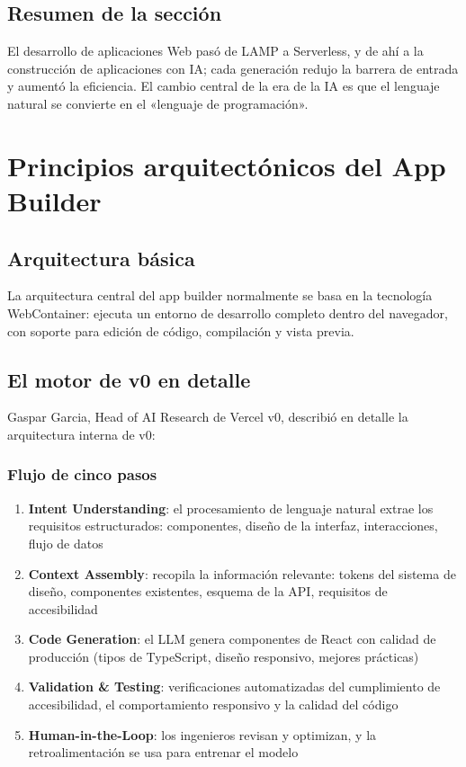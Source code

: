 \documentclass[a4paper]{article}
\begin{document}
\subsection{Resumen de la sección}

El desarrollo de aplicaciones Web pasó de LAMP a Serverless, y de ahí a la construcción de aplicaciones con IA; cada generación redujo la barrera de entrada y aumentó la eficiencia. El cambio central de la era de la IA es que el lenguaje natural se convierte en el «lenguaje de programación».

\section{Principios arquitectónicos del App Builder}

\subsection{Arquitectura básica}

La arquitectura central del app builder normalmente se basa en la tecnología WebContainer: ejecuta un entorno de desarrollo completo dentro del navegador, con soporte para edición de código, compilación y vista previa.

\subsection{El motor de v0 en detalle}

Gaspar Garcia, Head of AI Research de Vercel v0, describió en detalle la arquitectura interna de v0:

\subsubsection{Flujo de cinco pasos}

\begin{enumerate}
    \item \textbf{Intent Understanding}: el procesamiento de lenguaje natural extrae los requisitos estructurados: componentes, diseño de la interfaz, interacciones, flujo de datos
    \item \textbf{Context Assembly}: recopila la información relevante: tokens del sistema de diseño, componentes existentes, esquema de la API, requisitos de accesibilidad
    \item \textbf{Code Generation}: el LLM genera componentes de React con calidad de producción (tipos de TypeScript, diseño responsivo, mejores prácticas)
    \item \textbf{Validation \& Testing}: verificaciones automatizadas del cumplimiento de accesibilidad, el comportamiento responsivo y la calidad del código
    \item \textbf{Human-in-the-Loop}: los ingenieros revisan y optimizan, y la retroalimentación se usa para entrenar el modelo
\end{enumerate}
\end{document}
